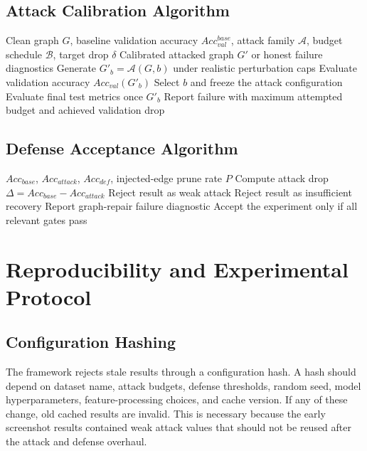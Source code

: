 \documentclass[12pt,oneside]{report}
\begin{document}
\section{Attack Calibration Algorithm}
\begin{algorithm}[H]
\caption{Validation-Only Attack Calibration}
\begin{algorithmic}[1]
\REQUIRE Clean graph $G$, baseline validation accuracy $Acc_{val}^{base}$, attack family $\mathcal{A}$, budget schedule $\mathcal{B}$, target drop $\delta$
\ENSURE Calibrated attacked graph $G'$ or honest failure diagnostics
    \STATE Generate $G'_b=\mathcal{A}(G,b)$ under realistic perturbation caps
    \STATE Evaluate validation accuracy $Acc_{val}(G'_b)$
        \STATE Select $b$ and freeze the attack configuration
        \STATE Evaluate final test metrics once
        \RETURN $G'_b$
    \ENDIF
\ENDFOR
\STATE Report failure with maximum attempted budget and achieved validation drop
\end{algorithmic}
\end{algorithm}

\section{Defense Acceptance Algorithm}
\begin{algorithm}[H]
\caption{Attack and Defense Acceptance Gate}
\begin{algorithmic}[1]
\REQUIRE $Acc_{base}$, $Acc_{attack}$, $Acc_{def}$, injected-edge prune rate $P$
\STATE Compute attack drop $\Delta=Acc_{base}-Acc_{attack}$
    \STATE Reject result as weak attack
\ENDIF
{}
    \STATE Reject result as insufficient recovery
\ENDIF
{}
    \STATE Report graph-repair failure diagnostic
\ENDIF
\STATE Accept the experiment only if all relevant gates pass
\end{algorithmic}
\end{algorithm}

\chapter{Reproducibility and Experimental Protocol}

\section{Configuration Hashing}
The framework rejects stale results through a configuration hash. A hash should depend on dataset name, attack budgets, defense thresholds, random seed, model hyperparameters, feature-processing choices, and cache version. If any of these change, old cached results are invalid. This is necessary because the early screenshot results contained weak attack values that should not be reused after the attack and defense overhaul.
\end{document}
